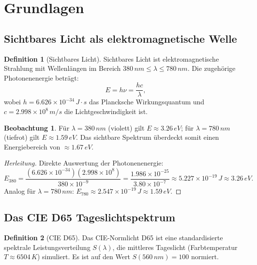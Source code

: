 ﻿\documentclass[a4paper,12pt]{article}
\theoremstyle{definition}
\newtheorem{definition}{Definition}
\newtheorem{beobachtung}{Beobachtung}
\begin{document}
\section{Grundlagen}

\subsection{Sichtbares Licht als elektromagnetische Welle}

\begin{definition}[Sichtbares Licht]
Sichtbares Licht ist elektromagnetische Strahlung mit Wellenlängen im Bereich
$380\,\si{nm} \le \lambda \le 780\,\si{nm}$. Die zugehörige Photonenenergie beträgt:
\[
  E = h\nu = \frac{hc}{\lambda},
\]
wobei $h = 6.626 \times 10^{-34}\,\si{J\cdot s}$ das Plancksche Wirkungsquantum und
$c = 2.998 \times 10^8\,\si{m/s}$ die Lichtgeschwindigkeit ist.
\end{definition}

\begin{beobachtung}
Für $\lambda = 380\,\si{nm}$ (violett) gilt $E \approx 3.26\,\si{eV}$;
für $\lambda = 780\,\si{nm}$ (tiefrot) gilt $E \approx 1.59\,\si{eV}$.
Das sichtbare Spektrum überdeckt somit einen Energiebereich von $\approx 1.67\,\si{eV}$.
\end{beobachtung}

\begin{proof}[Herleitung]
Direkte Auswertung der Photonenenergie:
\[
  E_{380} = \frac{(6.626\times10^{-34})(2.998\times10^8)}{380\times10^{-9}}
           = \frac{1.986\times10^{-25}}{3.80\times10^{-7}}
           \approx 5.227\times10^{-19}\,\si{J}
           \approx 3.26\,\si{eV}.
\]
Analog für $\lambda = 780\,\si{nm}$:
$E_{780} \approx 2.547\times10^{-19}\,\si{J} \approx 1.59\,\si{eV}$.
\end{proof}

\subsection{Das CIE D65 Tageslichtspektrum}

\begin{definition}[CIE D65]
Das CIE-Normlicht D65 ist eine standardisierte spektrale Leistungsverteilung $S(\lambda)$,
die mittleres Tageslicht (Farbtemperatur $T \approx 6504\,\si{K}$) simuliert.
Es ist auf den Wert $S(560\,\si{nm}) = 100$ normiert.
\end{definition}
\end{document}
